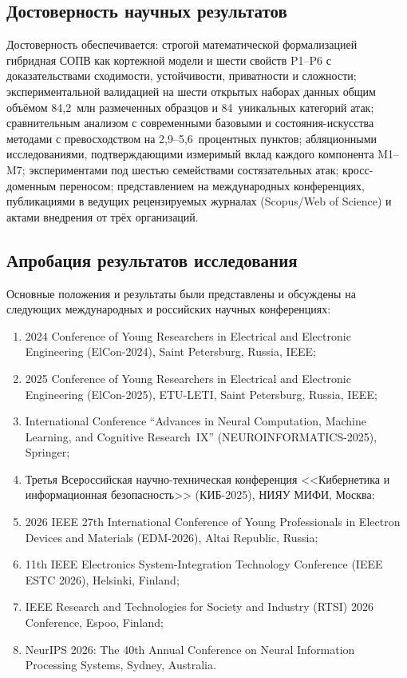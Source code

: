 \documentclass[12pt,a5paper]{article}
\begin{document}
\subsection*{Достоверность научных результатов}

Достоверность обеспечивается: строгой математической
формализацией гибридная СОПВ как кортежной модели и шести свойств
P1--P6 с доказательствами сходимости, устойчивости, приватности
и сложности; экспериментальной валидацией на шести открытых
наборах данных общим объёмом 84,2~млн размеченных образцов и
84~уникальных категорий атак; сравнительным анализом с
современными базовыми и состояния-искусства методами с
превосходством на 2,9--5,6~процентных пунктов; абляционными
исследованиями, подтверждающими измеримый вклад каждого
компонента M1--M7; экспериментами под шестью семействами
состязательных атак; кросс-доменным переносом; представлением
на международных конференциях, публикациями в ведущих
рецензируемых журналах (Scopus/Web of Science) и актами
внедрения от трёх организаций.

\subsection*{Апробация результатов исследования}

Основные положения и результаты были представлены и обсуждены
на следующих международных и российских научных конференциях:

\begin{enumerate}
\item 2024 Conference of Young Researchers in Electrical and
Electronic Engineering (ElCon-2024), Saint Petersburg, Russia, IEEE;
\item 2025 Conference of Young Researchers in Electrical and
Electronic Engineering (ElCon-2025), ETU-LETI, Saint Petersburg,
Russia, IEEE;
\item International Conference ``Advances in Neural Computation,
Machine Learning, and Cognitive Research~IX''
(NEUROINFORMATICS-2025), Springer;
\item Третья Всероссийская научно-техническая конференция
<<Кибернетика и информационная безопасность>> (КИБ-2025),
НИЯУ МИФИ, Москва;
\item 2026 IEEE 27th International Conference of Young
Professionals in Electron Devices and Materials (EDM-2026),
Altai Republic, Russia;
\item 11th IEEE Electronics System-Integration Technology
Conference (IEEE ESTC 2026), Helsinki, Finland;
\item IEEE Research and Technologies for Society and Industry
(RTSI) 2026 Conference, Espoo, Finland;
\item NeurIPS 2026: The 40th Annual Conference on Neural
Information Processing Systems, Sydney, Australia.
\end{enumerate}
\end{document}
